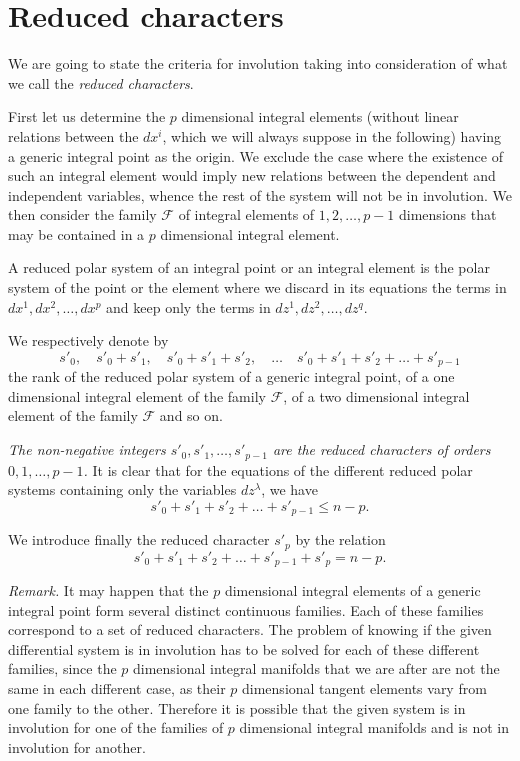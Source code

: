 \section{Reduced characters}
\label{sec:reduced-characters}

\fsec We are going to state the criteria for involution taking into consideration of what we call the \emph{reduced characters}.

First let us determine the $p$ dimensional integral elements (without linear relations between the $dx^{i}$, which we will always suppose in the following) having a generic integral point as the origin. We exclude the case where the existence of such an integral element would imply new relations between the dependent and independent variables, whence the rest of the system will not be in involution. We then consider the family $\mathcal{F}$ of integral elements of $1,2,\dots,p-1$ dimensions that may be contained in a $p$ dimensional integral element.
\begin{dfn*}
  A reduced polar system of an integral point or an integral element is the polar system of the point or the element where  we discard in  its equations the terms in $dx^{1},dx^{2},\dots,dx^{p}$ and keep only the terms in $dz^{1},dz^{2},\dots,dz^{q}$.
\end{dfn*}

We respectively denote by
\[
s'_{0},\quad s'_{0}+s'_{1},\quad s'_{0}+s'_{1}+s'_{2},\quad\dots\quad s'_{0}+s'_{1}+s'_{2}+\dots+s'_{p-1}
\]
the rank of the reduced polar system of a generic integral point, of a one dimensional integral element of the family $\mathcal{F}$, of a two dimensional integral element of the family $\mathcal{F}$ and so on.

\emph{The non-negative integers $s'_{0},s'_{1},\dots,s'_{p-1}$ are  the reduced characters of orders $0,1,\dots,p-1$.} It is clear that for the equations of the different reduced polar systems containing only the variables $dz^{\lambda}$, we have
\[
s'_{0}+s'_{1}+s'_{2}+\dots+s'_{p-1}\le n-p.
\]

We introduce finally the reduced character $s'_{p}$ by the relation
\[
s'_{0}+s'_{1}+s'_{2}+\dots+s'_{p-1}+s'_{p}=n-p.
\]


\vspace{12pt}\fsec \emph{Remark.} It may happen that the $p$ dimensional integral elements of a generic integral point form several distinct continuous families. Each of these families correspond to a set of reduced characters. The problem of knowing if the given differential system is in involution has to be solved for each of these different families, since the $p$ dimensional integral manifolds that we are after are not the same in each different case, as their $p$ dimensional tangent elements vary from one family to the other. Therefore it is possible that the given system is in involution for one of the families of $p$ dimensional integral manifolds and is not in involution for another.


